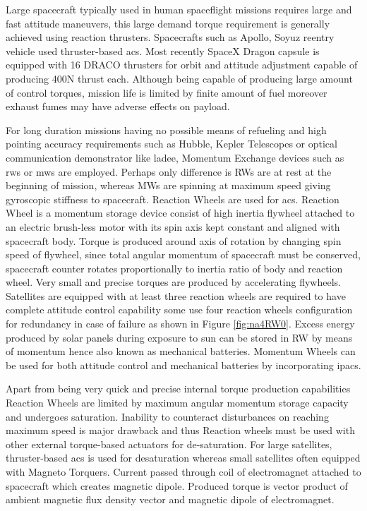 Large spacecraft typically used in human spaceflight missions requires large and fast attitude maneuvers, this large demand torque requirement is generally achieved using reaction thrusters. Spacecrafts such as Apollo, Soyuz reentry vehicle used thruster-based \acrshort{acs}. Most recently SpaceX Dragon capsule is equipped with 16 DRACO thrusters \cite{web:SpaceXDargon} for orbit and attitude adjustment capable of producing 400N thrust each.\cite{book:SPACEX} Although being capable of producing large amount of control torques, mission life is limited by finite amount of fuel moreover exhaust fumes may have adverse effects on payload.

For long duration missions having no possible means of refueling and high pointing accuracy requirements such as Hubble, Kepler Telescopes or optical communication demonstrator like \acrfull{ladee}, Momentum Exchange devices such as \acrfull{rws} or \acrfull{mws} are employed. Perhaps only difference is RWs are at rest at the beginning of mission, whereas MWs are spinning at maximum speed giving gyroscopic stiffness to spacecraft.
Reaction Wheels are used for \acrshort{acs}. Reaction Wheel is a momentum storage device consist of high inertia flywheel attached to an electric brush-less motor with its spin axis kept constant and aligned with spacecraft body. Torque is produced around axis of rotation by changing spin speed of flywheel, since total angular momentum of spacecraft must be conserved, spacecraft counter rotates proportionally to inertia ratio of body and reaction wheel. Very small and precise torques are produced by accelerating flywheels. Satellites are equipped with at least three reaction wheels are required to have complete attitude control capability some use four reaction wheels configuration for redundancy in case of failure as shown in Figure \ref{fig:na4RW0}. Excess energy produced by solar panels during exposure to sun can be stored in RW by means of momentum hence also known as mechanical batteries. Momentum Wheels can be used for both attitude control and mechanical batteries by incorporating \acrfull{ipacs}. \cite{TsiotrasPowerTracking} 

Apart from being very quick and precise internal torque production capabilities Reaction Wheels are limited by maximum angular momentum storage capacity and undergoes saturation. Inability to counteract disturbances on reaching maximum speed is major drawback and thus Reaction wheels must be used with other external torque-based actuators for de-saturation. For large satellites, thruster-based \acrshort{acs} is used for desaturation whereas small satellites often equipped with Magneto Torquers. Current passed through coil of electromagnet attached to spacecraft which creates magnetic dipole. Produced torque is vector product of ambient magnetic flux density vector and magnetic dipole of electromagnet.

